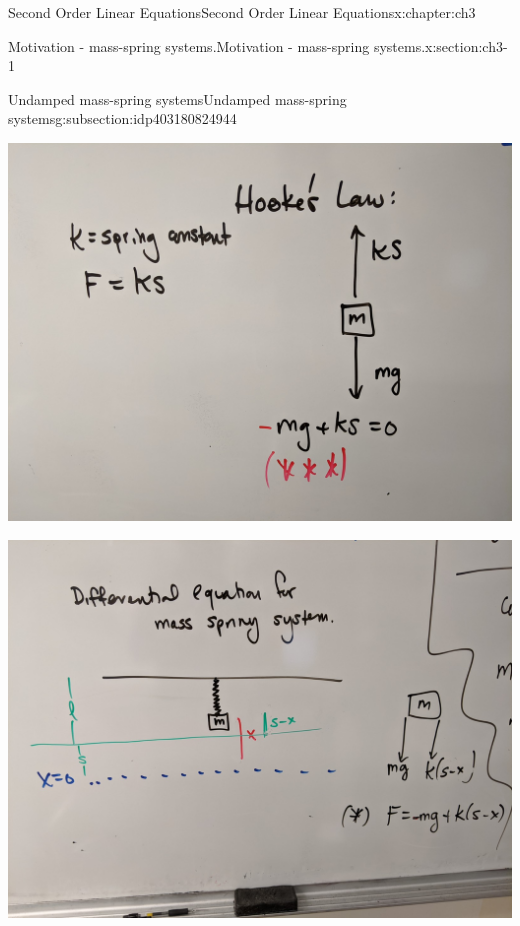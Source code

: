 \documentclass[oneside,10pt,]{book}
\numberwithin{equation}{section}
\numberwithin{equation}{section}
\begin{document}
\begin{chapterptx}{Second Order Linear Equations}{}{Second Order Linear Equations}{}{}{x:chapter:ch3}
\begin{sectionptx}{Motivation - mass-spring systems.}{}{Motivation - mass-spring systems.}{}{}{x:section:ch3-1}
\begin{subsectionptx}{Undamped mass-spring systems}{}{Undamped mass-spring systems}{}{}{g:subsection:idp403180824944}
\begin{image}{0}{1}{0}
\includegraphics[width=\linewidth]{images/hookes.jpg}
\end{image}%
\begin{image}{0}{1}{0}%
\includegraphics[width=\linewidth]{images/spring_diff_1.jpg}
\end{image}%
\begin{image}{0}{1}{0}%

\end{image}
\end{subsectionptx}
\end{sectionptx}
\end{chapterptx}
\end{document}
